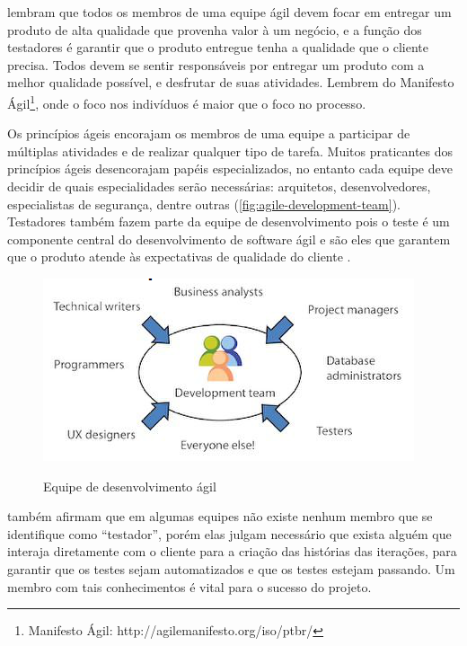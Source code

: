 \documentclass[
	12pt,				%
	openright,			%
	oneside,			%
	a4paper,			%
	english,			%
	brazil,				%
	]{abntex2}
\begin{document}
 lembram que todos os membros de uma equipe ágil devem focar em entregar um produto de alta qualidade que provenha valor à um negócio, e a função dos testadores é garantir que o produto entregue tenha a qualidade que o cliente precisa. Todos devem se sentir responsáveis por entregar um produto com a melhor qualidade possível, e desfrutar de suas atividades. Lembrem do Manifesto Ágil\footnote{Manifesto Ágil: http://agilemanifesto.org/iso/ptbr/}, onde o foco nos indivíduos é maior que o foco no processo. %

Os princípios ágeis encorajam os membros de uma equipe a participar de múltiplas atividades e de realizar qualquer tipo de tarefa. Muitos praticantes dos princípios ágeis desencorajam papéis especializados, no entanto cada equipe deve decidir de quais especialidades serão necessárias: arquitetos, desenvolvedores, especialistas de segurança, dentre outras (\autoref{fig:agile-development-team}). Testadores também fazem parte da equipe de desenvolvimento pois o teste é um componente central do desenvolvimento de software ágil e são eles que garantem que o produto atende às expectativas de qualidade do cliente \cite{crispin2009}.

\begin{figure}[H]
    \centering
    \caption{Equipe de desenvolvimento ágil}
    \graphicspath{ {./graphics/agile/} }
    \includegraphics[scale=1.0]{agile-development-team}
    \label{fig:agile-development-team}
\end{figure}

 também afirmam que em algumas equipes não existe nenhum membro que se identifique como ``testador'', porém elas julgam necessário que exista alguém que interaja diretamente com o cliente para a criação das histórias das iterações, para garantir que os testes sejam automatizados e que os testes estejam passando. Um membro com tais conhecimentos é vital para o sucesso do projeto.
\end{document}
